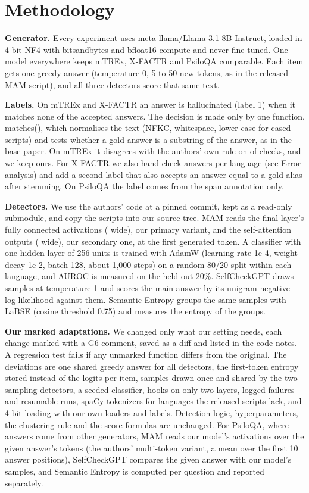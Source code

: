 \documentclass[12pt]{article}
\begin{document}
\section{Methodology}
\textbf{Generator.} Every experiment uses meta-llama/Llama-3.1-8B-Instruct, loaded in 4-bit NF4 with bitsandbytes and bfloat16 compute and never fine-tuned. One model everywhere keeps mTREx, X-FACTR and PsiloQA comparable. Each item gets one greedy answer (temperature 0, 5 to 50 new tokens, as in the released MAM script), and all three detectors score that same text.

\textbf{Labels.} On mTREx and X-FACTR an answer is hallucinated (label 1) when it matches none of the accepted answers. The decision is made only by one function, matches(), which normalises the text (NFKC, whitespace, lower case for cased scripts) and tests whether a gold answer is a substring of the answer, as in the base paper. On mTREx it disagrees with the authors' own rule on \matcherdisagree{} of \matcherchecks{} checks, and we keep ours. For X-FACTR we also hand-check \hcper{} answers per language (see Error analysis) and add a second label that also accepts an answer equal to a gold alias after stemming. On PsiloQA the label comes from the span annotation only.

\textbf{Detectors.} We use the authors' code at a pinned commit, kept as a read-only submodule, and copy the scripts into our source tree. MAM reads the final layer's fully connected activations (\fcwidth{} wide), our primary variant, and the self-attention outputs (\attnwidth{} wide), our secondary one, at the first generated token. A classifier with one hidden layer of 256 units is trained with AdamW (learning rate 1e-4, weight decay 1e-2, batch 128, about 1,000 steps) on a random 80/20 split within each language, and AUROC is measured on the held-out 20\%. SelfCheckGPT draws \numsamples{} samples at temperature 1 and scores the main answer by its unigram negative log-likelihood against them. Semantic Entropy groups the same samples with LaBSE (cosine threshold 0.75) and measures the entropy of the groups.

\textbf{Our marked adaptations.} We changed only what our setting needs, each change marked with a G6 comment, saved as a diff and listed in the code notes. A regression test fails if any unmarked function differs from the original. The \gendevs{} deviations are one shared greedy answer for all detectors, the first-token entropy stored instead of the \logitwidth{} logits per item, samples drawn once and shared by the two sampling detectors, a seeded classifier, hooks on only two layers, logged failures and resumable runs, spaCy tokenizers for languages the released scripts lack, and 4-bit loading with our own loaders and labels. Detection logic, hyperparameters, the clustering rule and the score formulas are unchanged. For PsiloQA, where answers come from other generators, MAM reads our model's activations over the given answer's tokens (the authors' multi-token variant, a mean over the first 10 answer positions), SelfCheckGPT compares the given answer with our model's samples, and Semantic Entropy is computed per question and reported separately.
\end{document}
